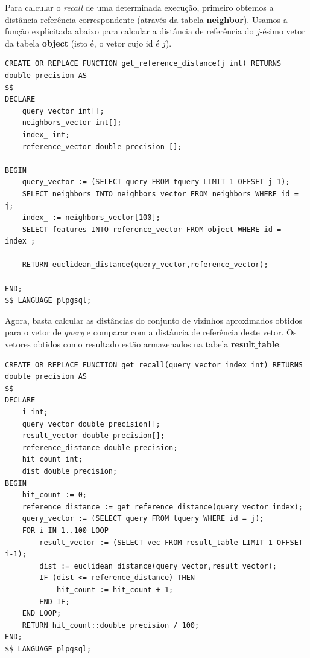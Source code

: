 \documentclass[a4paper,12pt,titlepage]{scrartcl}
\begin{document}
Para calcular o \emph{recall} de uma determinada execução, primeiro obtemos a distância referência correspondente (através da tabela \textbf{neighbor}). Usamos a função explicitada abaixo para calcular a distância de referência do $j$-ésimo vetor da tabela \textbf{object} (isto é, o vetor cujo id é $j$).\\


\begin{minipage}\linewidth
\begin{lstlisting}[caption = Calculando a distância de referência., label = refdist]
CREATE OR REPLACE FUNCTION get_reference_distance(j int) RETURNS double precision AS
$$
DECLARE
	query_vector int[];
	neighbors_vector int[];
	index_ int;
	reference_vector double precision [];
	
BEGIN 
	query_vector := (SELECT query FROM tquery LIMIT 1 OFFSET j-1);
 	SELECT neighbors INTO neighbors_vector FROM neighbors WHERE id = j;
	index_ := neighbors_vector[100];
	SELECT features INTO reference_vector FROM object WHERE id = index_;
	
	RETURN euclidean_distance(query_vector,reference_vector);
	
END;
$$ LANGUAGE plpgsql;

\end{lstlisting}
\end{minipage}
\vspace{5mm}

Agora, basta calcular as distâncias do conjunto de vizinhos aproximados obtidos para o vetor de \emph{query} e comparar com a distância de referência deste vetor. Os vetores obtidos como resultado estão armazenados na tabela \textbf{result$\_$table}.\\

\begin{minipage}\linewidth
\begin{lstlisting}[caption = Calculando o \emph{recall}., label = recallfunc]
CREATE OR REPLACE FUNCTION get_recall(query_vector_index int) RETURNS double precision AS
$$
DECLARE
	i int;
	query_vector double precision[];
	result_vector double precision[];
	reference_distance double precision;
	hit_count int;
	dist double precision;
BEGIN
	hit_count := 0;
	reference_distance := get_reference_distance(query_vector_index);
	query_vector := (SELECT query FROM tquery WHERE id = j);
	FOR i IN 1..100 LOOP
		result_vector := (SELECT vec FROM result_table LIMIT 1 OFFSET i-1);
		dist := euclidean_distance(query_vector,result_vector);
		IF (dist <= reference_distance) THEN
			hit_count := hit_count + 1;
		END IF;
	END LOOP;
	RETURN hit_count::double precision / 100;
END;
$$ LANGUAGE plpgsql;

\end{lstlisting}
\end{minipage}
\vspace{5mm}
\end{document}

